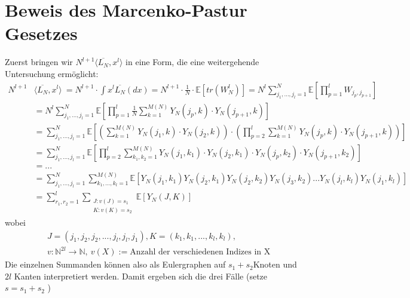 \documentclass[a4paper, 11pt]{scrreprt}
\newcommand{\EE}{\mathbb{E}}
\newcommand{\NN}{\mathbb{N}}
\begin{document}
\section{Beweis des Marcenko-Pastur Gesetzes}
Zuerst bringen wir \(N^{l+1} \langle \overline{L_N}, x^l \rangle\) in eine Form, die eine weitergehende Untersuchung ermöglicht:
\begin{equation}
\begin{split}
		N^{l+1} &\langle \overline{L_N}, x^l \rangle\ 
		= N^{l+1} \cdot \int x^l \overline{L_N}(dx) 
		= N^{l+1} \cdot \frac{1}{N} \cdot \EE[tr(W^l_N)] 
		= N^l \sum_{j_1,...,j_l = 1}^N \EE\left[\prod_{p = 1}^l W_{j_p,j_{p+1}}\right] \\
		&= N^l \sum_{j_1,...,j_l = 1}^N \EE\left[\prod_{p = 1}^l \frac{1}{N} \sum_{k = 1}^{M(N)} Y_N(j_p,k) \cdot Y_N(j_{p+1},k) \right] \\
		&= \sum_{j_1,...,j_l = 1}^N \EE \left[\left(\sum_{k = 1}^{M(N)} Y_N(j_1,k) \cdot Y_N(j_2,k)\right) \cdot \left(\prod_{p = 2}^l \sum_{k = 1}^{M(N)} Y_N(j_p,k) \cdot Y_N(j_{p+1},k) \right) \right] \\
		&= \sum_{j_1,...,j_l = 1}^N \EE\left[	\prod_{p = 2}^l \sum_{k_1,k_2 = 1}^{M(N)} Y_N(j_1,k_1) \cdot Y_N(j_2,k_1) \cdot Y_N(j_p,k_2) \cdot Y_N(j_{p+1},k_2) \right] \\
		&= ... \\
		&= \sum_{j_1,...,j_l = 1}^N \sum_{k_1,...,k_l = 1}^{M(N)} \EE[Y_N(j_1,k_1) Y_N(j_2,k_1) Y_N(j_2,k_2) Y_N(j_3,k_2) ... Y_N(j_l,k_l) Y_N(j_1,k_l)]\\
 &= \sum_{r_1,r_2 = 1}^l \sum_{\substack{J:v(J)=s_1\\ K:v(K)=s_2 }} \EE[Y_N(J,K)]
\end{split}
\end{equation}
wobei 
\begin{align*}
	&J=(j_1,j_2,j_2,...,j_l,j_l,j_1), K=(k_1,k_1,...,k_l,k_l),\\
	&v: \NN^{2l}\to \NN,\ v(X) := \text{Anzahl der verschiedenen Indizes in X}
\end{align*}
Die einzelnen Summanden können also als Eulergraphen auf \(s_1+s_2 \)Knoten und \(2l\) Kanten interpretiert werden.
Damit ergeben sich die drei Fälle (setze \(s = s_1+s_2\) )
\end{document}
